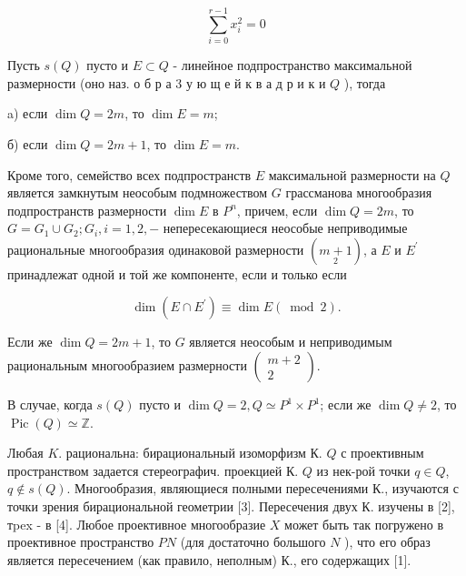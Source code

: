 \documentclass[10pt]{article}
\begin{document}
\[

\sum_{i=0}^{r-1} x_{i}^{2}=0

\]



Пусть $s(Q)$ пусто и $E \subset Q$ - линейное подпространство максимальной размерности (оно наз. о б р а 3 у ю щ е й к в а д р и к и $Q$ ), тогда



a) если $\operatorname{dim} Q=2 m$, то $\operatorname{dim} E=m$;



б) если $\operatorname{dim} Q=2 m+1$, то $\operatorname{dim} E=m$.



Кроме того, семейство всех подпространств $E$ максимальной размерности на $Q$ является замкнутым неособым подмножеством $G$ грассманова многообразия подпространств размерности $\operatorname{dim} E$ в $P^{n}$, причем, если $\operatorname{dim} Q=2 m$, то $G=G_{1} \cup G_{2} ; G_{i}, i=1,2,-$ непересекающиеся неособые неприводимые рациональные многообразия одинаковой размерности $(\underset{2}{m+1})$, а $E$ и $E^{\prime}$ принадлежат одной и той же компоненте, если и только если



\[

\operatorname{dim}\left(E \cap E^{\prime}\right) \equiv \operatorname{dim} E(\bmod 2) .

\]



Если же $\operatorname{dim} Q=2 m+1$, то $G$ является неособым и неприводимым рациональным многообразием размерности $\left(\begin{array}{l}m+2 \\ 2\end{array}\right)$.



В случае, когда $s(Q)$ пусто и $\operatorname{dim} Q=2, Q \simeq P^{1} \times P^{1}$; если же $\operatorname{dim} Q \neq 2$, то $\operatorname{Pic}(Q) \simeq \mathbb{Z}$.



Любая $K$. рациональна: бирациональный изоморфизм К. $Q$ с проективным пространством задается стереографич. проекцией К. $Q$ из нек-рой точки $q \in Q$, $q \notin s(Q)$. Многообразия, являющиеся полными пересечениями К., изучаются с точки зрения бирациональной геометрии [3]. Пересечения двух К. изучены в [2], тpex - в [4]. Любое проективное многообразие $X$ может быть так погружено в проективное пространство $P N$ (для достаточно большого $N$ ), что его образ является пересечением (как правило, неполным) К., его содержащих [1].
\end{document}
